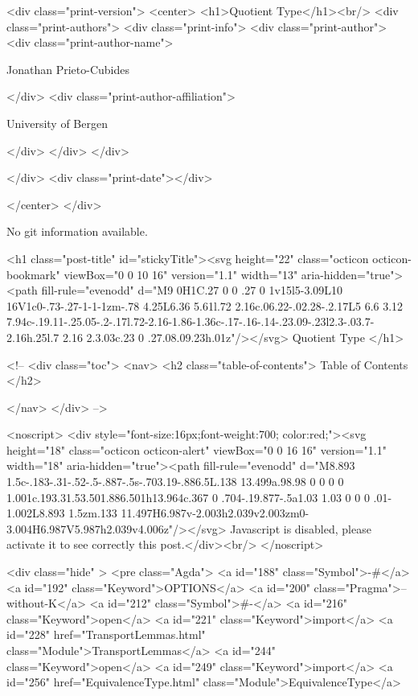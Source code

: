   <div class="print-version">
    <center>
      <h1>Quotient Type</h1><br/>
        <div class="print-authors">
          <div class="print-info">
            <div class="print-author">
              <div class="print-author-name">
                
                  Jonathan Prieto-Cubides
                
              </div>
              <div class="print-author-affiliation">
                
                  University of Bergen
                
                </div>
            </div>
          </div>
          
          
        </div>
        <div class="print-date"></div>
        
        
    </center>
  </div>

  
  No git information available.
  
  <h1 class="post-title" id="stickyTitle"><svg height="22" class="octicon octicon-bookmark" viewBox="0 0 10 16" version="1.1" width="13" aria-hidden="true"><path fill-rule="evenodd" d="M9 0H1C.27 0 0 .27 0 1v15l5-3.09L10 16V1c0-.73-.27-1-1-1zm-.78 4.25L6.36 5.61l.72 2.16c.06.22-.02.28-.2.17L5 6.6 3.12 7.94c-.19.11-.25.05-.2-.17l.72-2.16-1.86-1.36c-.17-.16-.14-.23.09-.23l2.3-.03.7-2.16h.25l.7 2.16 2.3.03c.23 0 .27.08.09.23h.01z"/></svg> Quotient Type
  </h1>

  <!-- 
  <div class="toc">
    <nav>
    <h2 class="table-of-contents"> Table of Contents </h2>
      

    </nav>
  </div>
   -->

  <noscript>
  <div style="font-size:16px;font-weight:700; color:red;"><svg height="18" class="octicon octicon-alert" viewBox="0 0 16 16" version="1.1" width="18" aria-hidden="true"><path fill-rule="evenodd" d="M8.893 1.5c-.183-.31-.52-.5-.887-.5s-.703.19-.886.5L.138 13.499a.98.98 0 0 0 0 1.001c.193.31.53.501.886.501h13.964c.367 0 .704-.19.877-.5a1.03 1.03 0 0 0 .01-1.002L8.893 1.5zm.133 11.497H6.987v-2.003h2.039v2.003zm0-3.004H6.987V5.987h2.039v4.006z"/></svg> Javascript is disabled, please activate it to see correctly this post.</div><br/>
  </noscript>

  <div class="hide" >
<pre class="Agda">
<a id="188" class="Symbol">{-#</a> <a id="192" class="Keyword">OPTIONS</a> <a id="200" class="Pragma">--without-K</a> <a id="212" class="Symbol">#-}</a>
<a id="216" class="Keyword">open</a> <a id="221" class="Keyword">import</a> <a id="228" href="TransportLemmas.html" class="Module">TransportLemmas</a>
<a id="244" class="Keyword">open</a> <a id="249" class="Keyword">import</a> <a id="256" href="EquivalenceType.html" class="Module">EquivalenceType</a>

